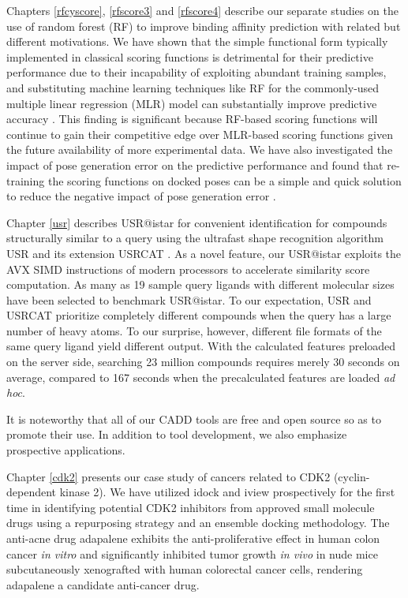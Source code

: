 Chapters \ref{rfcyscore}, \ref{rfscore3} and \ref{rfscore4} describe our separate studies \citep{1432,1433,1434} on the use of random forest (RF) to improve binding affinity prediction with related but different motivations. We have shown that the simple functional form typically implemented in classical scoring functions is detrimental for their predictive performance due to their incapability of exploiting abundant training samples, and substituting machine learning techniques like RF for the commonly-used multiple linear regression (MLR) model can substantially improve predictive accuracy \citep{1432,1433}. This finding is significant because RF-based scoring functions will continue to gain their competitive edge over MLR-based scoring functions given the future availability of more experimental data. We have also investigated the impact of pose generation error on the predictive performance and found that re-training the scoring functions on docked poses can be a simple and quick solution to reduce the negative impact of pose generation error \citep{1434}.

Chapter \ref{usr} describes USR@istar for convenient identification for compounds structurally similar to a query using the ultrafast shape recognition algorithm USR \citep{1379} and its extension USRCAT \citep{1331}. As a novel feature, our USR@istar exploits the AVX SIMD instructions of modern processors to accelerate similarity score computation. As many as 19 sample query ligands with different molecular sizes have been selected to benchmark USR@istar. To our expectation, USR and USRCAT prioritize completely different compounds when the query has a large number of heavy atoms. To our surprise, however, different file formats of the same query ligand yield different output. With the calculated features preloaded on the server side, searching 23 million compounds requires merely 30 seconds on average, compared to 167 seconds when the precalculated features are loaded \textit{ad hoc}.

It is noteworthy that all of our CADD tools are free and open source so as to promote their use. In addition to tool development, we also emphasize prospective applications.

Chapter \ref{cdk2} presents our case study of cancers related to CDK2 (cyclin-dependent kinase 2). We have utilized idock \citep{1153,1362} and \citep{1366} iview prospectively for the first time in identifying potential CDK2 inhibitors from approved small molecule drugs using a repurposing strategy and an ensemble docking methodology. The anti-acne drug adapalene exhibits the anti-proliferative effect in human colon cancer \textit{in vitro} and significantly inhibited tumor growth \textit{in vivo} in nude mice subcutaneously xenografted with human colorectal cancer cells, rendering adapalene a candidate anti-cancer drug.

